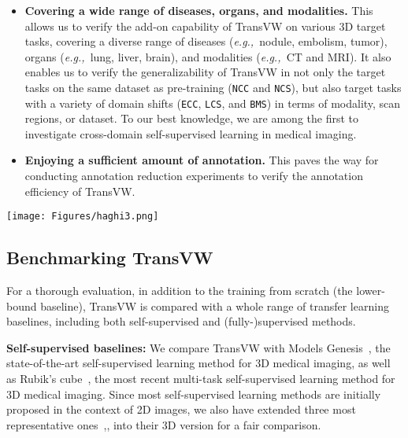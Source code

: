 \documentclass[journal,twoside,web]{ieeecolor}
\newcommand{\ie}{\mbox{\emph{i.e.,\ }}}
\newcommand{\eg}{\mbox{\emph{e.g.,\ }}}
\begin{document}
\begin{itemize}
    \item \textbf{Covering a wide range of diseases, organs, and modalities.} This allows us to verify the add-on capability of TransVW on various 3D target tasks, covering a diverse range of diseases (\eg nodule, embolism, tumor), organs (\eg lung, liver, brain), and modalities (\eg CT and MRI). It also enables us to verify the generalizability of TransVW in not only the target tasks on the same dataset as pre-training (\texttt{NCC} and \texttt{NCS}), but also target tasks with a variety of domain shifts (\texttt{ECC}, \texttt{LCS},  and \texttt{BMS}) in terms of modality, scan regions, or dataset. To our best knowledge, we are among the first to investigate cross-domain self-supervised learning in medical imaging. 
    \item \textbf{Enjoying a sufficient amount of annotation.} This paves the way for conducting annotation reduction experiments to verify the annotation efficiency of TransVW.
\end{itemize}



\begin{figure*}[t]
\centerline{\texttt{[image: Figures/haghi3.png]}}
\caption{ Our self-supervised learning scheme serves as an add-on, which can be added to enrich  existing self-supervised learning methods. 
By introducing self-discovery and self-classification of visual words, we empower four representative  self-supervised learning advances (\ie Inpainting~\cite{pathak2016context},  Context restoration (Shuffling)~\cite{chen2019self}, Rotation~\cite{gidaris2018unsupervised}, and Models Genesis~\cite{zhou2019models}) to capture more high-level and diverse representations, resulting in substantial ()  performance improvements on five 3D target  tasks.}
\label{fig:w_wo_semantics}
\end{figure*}


\subsection{Benchmarking TransVW} 
\label{sec:baselines_and_implementation}

For a thorough evaluation, in addition to the training from scratch (the lower-bound baseline), TransVW is compared with a whole range of transfer learning baselines, including both self-supervised and (fully-)supervised methods.

\smallskip
\noindent\textbf{Self-supervised baselines:}  
We compare TransVW with Models Genesis~\cite{zhou2019models}, the state-of-the-art self-supervised learning method for 3D medical imaging, as well as Rubik's cube~\cite{Zhuang2019Self}, the most recent multi-task self-supervised learning method for 3D medical imaging. 
Since most self-supervised learning methods are initially proposed in the context of 2D images, we also have extended three most representative ones~\cite{chen2019self},\cite{pathak2016context},\cite{gidaris2018unsupervised} into their 3D version for a fair comparison.
\end{document}
